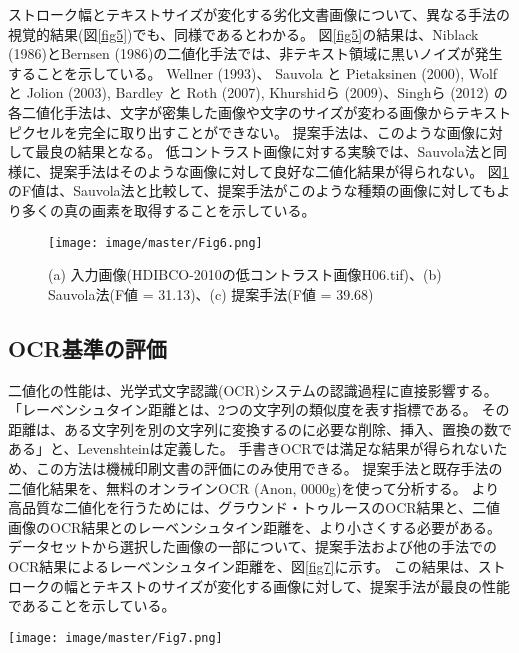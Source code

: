 \documentclass[uplatex, twocolumn,10pt]{jsarticle}
\begin{document}
ストローク幅とテキストサイズが変化する劣化文書画像について、異なる手法の視覚的結果(図\ref{fig5})でも、同様であるとわかる。
図\ref{fig5}の結果は、Niblack (1986)とBernsen (1986)の二値化手法では、非テキスト領域に黒いノイズが発生することを示している。
Wellner (1993)、 Sauvola と Pietaksinen (2000), Wolf と Jolion (2003), Bardley と Roth (2007), 
Khurshidら (2009)、Singhら (2012) の各二値化手法は、文字が密集した画像や文字のサイズが変わる画像からテキストピクセルを完全に取り出すことができない。
提案手法は、このような画像に対して最良の結果となる。
低コントラスト画像に対する実験では、Sauvola法と同様に、提案手法はそのような画像に対して良好な二値化結果が得られない。
図\ref{fig6}のF値は、Sauvola法と比較して、提案手法がこのような種類の画像に対してもより多くの真の画素を取得することを示している。

\begin{figure}[t]
    \begin{center}
        \texttt{[image: image/master/Fig6.png]}
        \caption{(a) 入力画像(HDIBCO-2010の低コントラスト画像H06.tif)、(b) Sauvola法(F値 = 31.13)、(c) 提案手法(F値 = 39.68)}
        \label{fig6}
    \end{center}
\end{figure}


\subsection{OCR基準の評価}

二値化の性能は、光学式文字認識(OCR)システムの認識過程に直接影響する。
「レーベンシュタイン距離とは、2つの文字列の類似度を表す指標である。
その距離は、ある文字列を別の文字列に変換するのに必要な削除、挿入、置換の数である」と、Levenshteinは定義した。
手書きOCRでは満足な結果が得られないため、この方法は機械印刷文書の評価にのみ使用できる。
提案手法と既存手法の二値化結果を、無料のオンラインOCR (Anon, 0000g)\cite{bib32}を使って分析する。
より高品質な二値化を行うためには、グラウンド・トゥルースのOCR結果と、二値画像のOCR結果とのレーベンシュタイン距離を、より小さくする必要がある。
データセットから選択した画像の一部について、提案手法および他の手法でのOCR結果によるレーベンシュタイン距離を、図\ref{fig7}に示す。
この結果は、ストロークの幅とテキストのサイズが変化する画像に対して、提案手法が最良の性能であることを示している。


\begin{figure*}[t]
    \begin{center}
        \texttt{[image: image/master/Fig7.png]}
        \caption{DIBCO-2011データセットの画像 PR3.png の一部に対するOCR結果とレーベンシュタイン距離}
        \label{fig7}
    \end{center}
\end{figure*}
\end{document}
